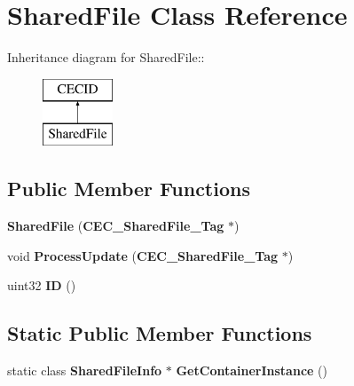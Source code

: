 \section{SharedFile Class Reference}
\label{classSharedFile}
Inheritance diagram for SharedFile::\begin{figure}[H]
\begin{center}
\leavevmode
\includegraphics[height=2cm]{classSharedFile}
\end{center}
\end{figure}
\subsection*{Public Member Functions}
\begin{DoxyCompactItemize}
\item 
{\bfseries SharedFile} ({\bf CEC\_\-SharedFile\_\-Tag} $\ast$)\label{classSharedFile_af26e31cf1184e58d80d64e922f369661}

\item 
void {\bfseries ProcessUpdate} ({\bf CEC\_\-SharedFile\_\-Tag} $\ast$)\label{classSharedFile_a120a3daa137e30251dbf2bd7863e36dd}

\item 
uint32 {\bfseries ID} ()\label{classSharedFile_ae9d8a4535eefa4ab3c49a3fa01d80cf8}

\end{DoxyCompactItemize}
\subsection*{Static Public Member Functions}
\begin{DoxyCompactItemize}
\item 
static class {\bf SharedFileInfo} $\ast$ {\bfseries GetContainerInstance} ()\label{classSharedFile_a67e1dca760a714fb3202e57a112261f3}

\end{DoxyCompactItemize}
